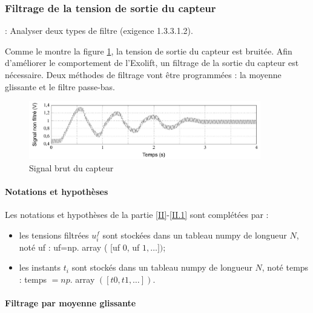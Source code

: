 \subsubsection{Filtrage de la tension de sortie du capteur}


\begin{objectif}:
Analyser deux types de filtre (exigence 1.3.3.1.2).
\end{objectif}

Comme le montre la figure \ref{fig10}, la tension de sortie du capteur est bruitée. Afin d'améliorer le comportement de l'Exolift, un filtrage de la sortie du capteur est nécessaire. Deux méthodes de filtrage vont être programmées : la moyenne glissante et le filtre passe-bas.

\begin{figure}[!htb]
\begin{center}
\includegraphics[width=0.9\textwidth]{images/2023_10_30_d11e80da56f59e3b3cdfg-09(1)}
\caption{Signal brut du capteur \label{fig10}}
\end{center}
\end{figure}


\paragraph{Notations et hypothèses}

Les notations et hypothèses de la partie \ref{II}-\ref{II.1} sont complétées par :

\begin{itemize}
  \item les tensions filtrées $u_{i}^{f}$ sont stockées dans un tableau numpy de longueur $N$, noté uf : uf=np. array ( [uf 0, uf $1, \ldots])$;

  \item les instants $t_{i}$ sont stockés dans un tableau numpy de longueur $N$, noté temps : temps $=n p$. array $([t 0, t 1, \ldots])$.

\end{itemize}

\paragraph{Filtrage par moyenne glissante}


